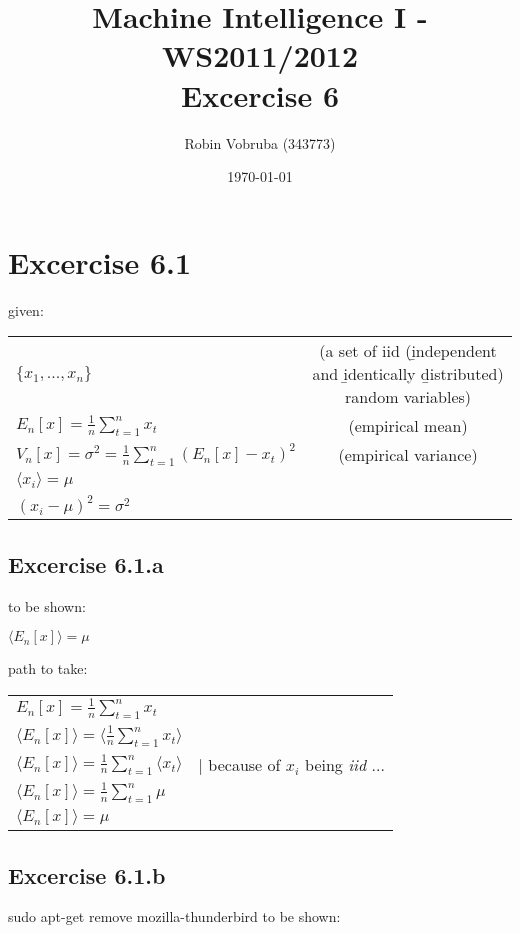 \documentclass[a4paper,headings=small]{scrartcl}
\title{Machine Intelligence I - WS2011/2012\\Excercise 6}
\author{Robin Vobruba (343773)}
\date{\today}
\numberwithin{equation}{section} %
\numberwithin{figure}{section}   %
\begin{document}
\maketitle


\section{Excercise 6.1}

given:

\begin{tabular}{lc}
$\{x_1, ... , x_n\}$ & (a set of iid (\b{i}ndependent and \b{i}dentically \b{d}istributed) random variables) \\

$E_n[x] = \frac{1}{n} \sum\limits_{t=1}^{n}{x_t}$ & (empirical mean) \\

$V_n[x] = \sigma^2 = \frac{1}{n} \sum\limits_{t=1}^{n}{(E_n[x] - x_t)^2}$ & (empirical variance) \\

$\langle x_i \rangle = \mu$ \\

$(x_i − \mu)^2 = \sigma^2$
\end{tabular}


\subsection{Excercise 6.1.a}

to be shown:

$\langle E_n[x] \rangle = \mu$

path to take:

\begin{tabular}{lc}
$E_n[x] = \frac{1}{n} \sum\limits_{t=1}^{n}{x_t}$ \\

$\langle E_n[x] \rangle = \langle \frac{1}{n} \sum\limits_{t=1}^{n}{x_t} \rangle$ \\

$\langle E_n[x] \rangle = \frac{1}{n} \sum\limits_{t=1}^{n}{\langle x_t \rangle}$ & $|$ because of $x_i$ being \emph{iid} ... \\

$\langle E_n[x] \rangle = \frac{1}{n} \sum\limits_{t=1}^{n}{\mu}$ \\

$\langle E_n[x] \rangle = \mu$
\end{tabular}


\subsection{Excercise 6.1.b}
sudo apt-get remove mozilla-thunderbird
to be shown:
\end{document}
